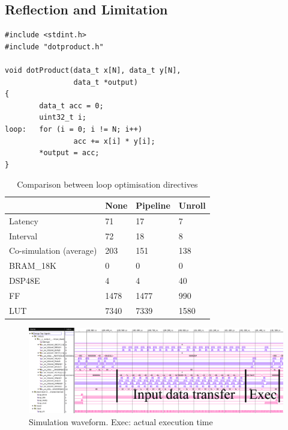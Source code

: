 \documentclass[journal]{IEEEtran}
\begin{document}
\subsection{Reflection and Limitation}

\iffalse

\begin{lstlisting}[caption={High level synthesis design for dot product},captionpos=b,label=lst:dotp]
#include <stdint.h>
#include "dotproduct.h"

void dotProduct(data_t x[N], data_t y[N],
                data_t *output)
{
        data_t acc = 0;
        uint32_t i;
loop:   for (i = 0; i != N; i++)
                acc += x[i] * y[i];
        *output = acc;
}
\end{lstlisting}



\begin{table}[!ht]
	\renewcommand{\arraystretch}{1.3}
	\caption{Comparison between loop optimisation directives}
	\label{tbl:dir}
	\centering
	\begin{tabular}{llll}
		\hline
			& None	& Pipeline	& Unroll \\
		\hline
		Latency	& 71	& 17	& 7	\\
		Interval	& 72	& 18	& 8	\\
		Co-simulation (average)	& 203	& 151	& 138	\\
		\hline
		BRAM\_18K	& 0	& 0	& 0	\\
		DSP48E	& 4	& 4	& 40	\\
		FF	& 1478	& 1477	& 990	\\
		LUT	& 7340	& 7339	& 1580	\\
		\hline
	\end{tabular}
\end{table}



\begin{figure}[!t]
	\centering
	\includegraphics[width=\textwidth]{sim}
	\caption{Simulation waveform. Exec: actual execution time}
	\label{fig:sim}
\end{figure}
\end{document}
